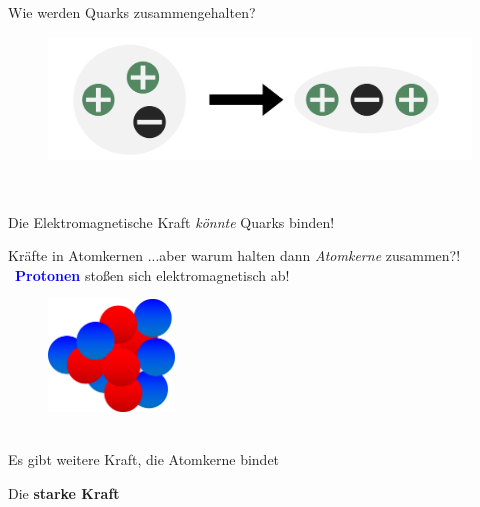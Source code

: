 
\begin{frame}{Wie werden Quarks zusammengehalten?}  
    \begin{figure}[htb]
        \includegraphics[width=1\textwidth]{Figures Introductory Lecture/Standard Model/StrongForce_EM.png}
        \label{fig:strong_force_1}
    \end{figure} \\
    \Large \begin{center}
        Die Elektromagnetische Kraft \emph{könnte} Quarks binden!
    \end{center}
\end{frame}
\begin{frame}{Kräfte in Atomkernen}
...aber warum halten dann \emph{Atomkerne} zusammen?!\\ \, \hspace{2cm}  \textcolor{blue}{\textbf{Protonen}} stoßen sich elektromagnetisch ab!

    \begin{figure}[htb]
        \includegraphics[width=0.3\textwidth]{Figures Introductory Lecture/Standard Model/Nukleus.png}
        \label{fig:strong_force_2}
    \end{figure}\\ \pause
     Es gibt weitere Kraft, die Atomkerne bindet\\ 
    \vspace{0.5cm}\begin{center}
    \Large{Die \textbf{starke Kraft}}
    \end{center}
\end{frame}

